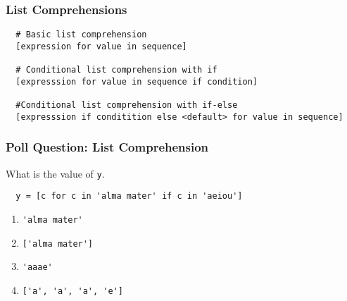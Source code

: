 \documentclass{beamer}
\begin{document}
%
%
\begin{frame}[fragile]
  \frametitle{List Comprehensions}
  \begin{lstlisting}
  # Basic list comprehension
  [expression for value in sequence]

  # Conditional list comprehension with if
  [expresssion for value in sequence if condition]

  #Conditional list comprehension with if-else
  [expresssion if conditition else <default> for value in sequence]
  \end{lstlisting}
\end{frame}

%
%
\begin{frame}[fragile]
  \frametitle{Poll Question: List Comprehension}
  What is the value of \lstinline|y|.
  \begin{lstlisting}
  y = [c for c in 'alma mater' if c in 'aeiou']
  \end{lstlisting}
  \vfill
  \begin{enumerate}[A]
    \item \lstinline|'alma mater'|
    \item \lstinline|['alma mater']|
    \item \lstinline|'aaae'|
    \item \lstinline|['a', 'a', 'a', 'e']|
  \end{enumerate}
\end{frame}
\end{document}
